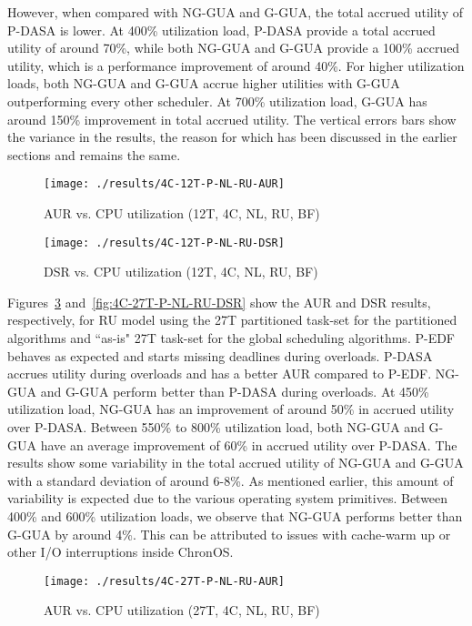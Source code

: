 \documentclass[12pt,dvips]{report}
\begin{document}
However, when compared with NG-GUA and G-GUA, the total accrued utility of P-DASA is lower. At 400\% utilization load, P-DASA provide a total accrued utility of around 70\%, while both NG-GUA and G-GUA provide a 100\% accrued utility, which is a performance improvement of around 40\%. For higher utilization loads, both NG-GUA and G-GUA accrue higher utilities with G-GUA outperforming every other scheduler. At 700\% utilization load, G-GUA has around 150\% improvement in total accrued utility. The vertical errors bars show the variance in the results, the reason for which has been discussed in the earlier sections and remains the same.

\begin{figure} [htbp]
  \centering
  \texttt{[image: ./results/4C-12T-P-NL-RU-AUR]}
  \caption{AUR vs. CPU utilization (12T, 4C, NL, RU, BF)}
  \label{fig:4C-12T-P-NL-RU-AUR}
\end{figure}
 
\begin{figure} [htbp]
  \centering
  \texttt{[image: ./results/4C-12T-P-NL-RU-DSR]}
  \caption{DSR vs. CPU utilization (12T, 4C, NL, RU, BF) }
\label{fig:4C-12T-P-NL-RU-DSR}
\end{figure}

Figures~\ref{fig:4C-27T-P-NL-RU-AUR} and~\ref{fig:4C-27T-P-NL-RU-DSR} show the AUR and DSR results, respectively, for RU model using the 27T partitioned task-set for the partitioned algorithms and ``as-is" 27T task-set for the global scheduling algorithms. P-EDF behaves as expected and starts missing deadlines during overloads. P-DASA accrues utility during overloads and has a better AUR compared to P-EDF. NG-GUA and G-GUA perform better than P-DASA during overloads. At 450\% utilization load, NG-GUA has an improvement of around 50\% in accrued utility over P-DASA. Between 550\% to 800\% utilization load, both NG-GUA and G-GUA have an average improvement of 60\% in accrued utility over P-DASA. The results show some variability in the total accrued utility of NG-GUA and G-GUA with a standard deviation of around 6-8\%. As mentioned earlier, this amount of variability is expected due to the various operating system primitives. Between 400\% and 600\% utilization loads, we observe that NG-GUA performs better than G-GUA by around 4\%. This can be attributed to issues with cache-warm up or other I/O interruptions inside ChronOS.

\begin{figure} [htbp]
  \centering
  \texttt{[image: ./results/4C-27T-P-NL-RU-AUR]}
  \caption{AUR vs. CPU utilization (27T, 4C, NL, RU, BF) }
\label{fig:4C-27T-P-NL-RU-AUR}
\end{figure}
 
\end{document}
